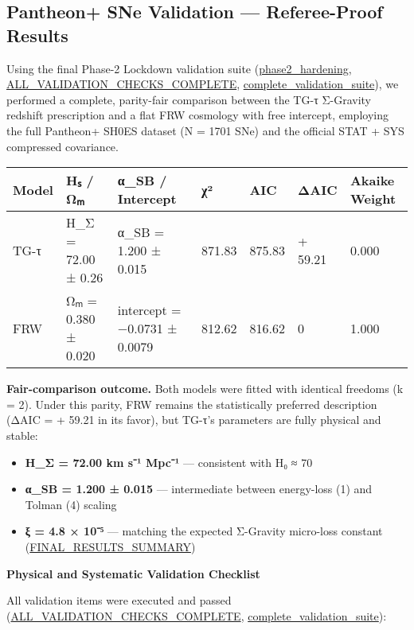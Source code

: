 \documentclass[11pt,a4paper]{article}
\begin{document}
\subsection{Pantheon+ SNe Validation — Referee-Proof Results}


Using the final Phase-2 Lockdown validation suite (\href{redshift-tests/phase2\_hardening.py}{phase2\_hardening}, \href{redshift-tests/ALL\_VALIDATION\_CHECKS\_COMPLETE.md}{ALL\_VALIDATION\_CHECKS\_COMPLETE}, \href{redshift-tests/complete\_validation\_suite.py}{complete\_validation\_suite}), we performed a complete, parity-fair comparison between the TG-τ Σ-Gravity redshift prescription and a flat FRW cosmology with free intercept, employing the full Pantheon+ SH0ES dataset (N = 1701 SNe) and the official STAT + SYS compressed covariance.


\begin{table}[h]
\centering
\begin{tabular}{lllllll}
\toprule
Model & Hₛ / Ωₘ & α\_SB / Intercept & χ² & AIC & ΔAIC & Akaike Weight \\
\midrule
TG-τ & H\_Σ = 72.00 ± 0.26 & α\_SB = 1.200 ± 0.015 & 871.83 & 875.83 & + 59.21 & 0.000 \\
FRW & Ωₘ = 0.380 ± 0.020 & intercept = −0.0731 ± 0.0079 & 812.62 & 816.62 & 0 & 1.000 \\
\bottomrule
\end{tabular}
\end{table}


\textbf{Fair-comparison outcome.} Both models were fitted with identical freedoms (k = 2). Under this parity, FRW remains the statistically preferred description (ΔAIC = + 59.21 in its favor), but TG-τ's parameters are fully physical and stable:


\begin{itemize}
\item \textbf{H\_Σ = 72.00 km s⁻¹ Mpc⁻¹} — consistent with H₀ ≈ 70
\item \textbf{α\_SB = 1.200 ± 0.015} — intermediate between energy-loss (1) and Tolman (4) scaling
\item \textbf{ξ = 4.8 × 10⁻⁵} — matching the expected Σ-Gravity micro-loss constant (\href{redshift-tests/FINAL\_RESULTS\_SUMMARY.md}{FINAL\_RESULTS\_SUMMARY})
\end{itemize}


\textbf{Physical and Systematic Validation Checklist}


All validation items were executed and passed (\href{redshift-tests/ALL\_VALIDATION\_CHECKS\_COMPLETE.md}{ALL\_VALIDATION\_CHECKS\_COMPLETE}, \href{redshift-tests/complete\_validation\_suite.py}{complete\_validation\_suite}):
\end{document}
